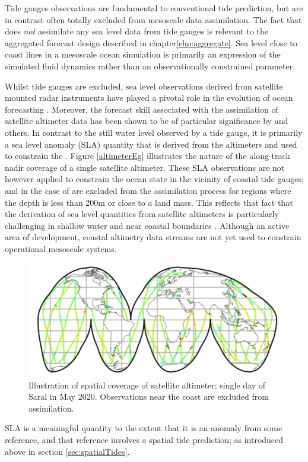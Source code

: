 Tide gauges observations are fundamental to conventional tide prediction, but are in contrast often totally excluded from mesoscale data assimilation.   The fact that \BL{} does \emph{not} assimilate any sea level data from tide gauges is relevant to the aggregated forecast design described in chapter\ref{chp:aggregate}.      
Sea level close to coast lines in a mesoscale ocean simulation is primarily an expression of the simulated fluid dynamics rather than an observationally constrained parameter.

Whilst tide gauges are excluded, sea level observations derived from satellite mounted radar instruments have played a pivotal role in the evolution of ocean forecasting \citep{Fu:2001ub}.  Moreover, the forecast skill associated with the assimilation of satellite altimeter data has been shown to be of particular significance by  \cite{10.5194/os-13-1077-2017} and others.
In contrast to the still water level observed by a tide gauge, it is primarily a sea level anomaly (SLA) quantity that is derived from the altimeters and used to constrain the \OGCM{}. Figure \ref{altimeterEg} illustrates the nature of the along-track nadir coverage of a single satellite altimeter.
These SLA observations are not however applied to constrain the ocean state in the vicinity of coastal tide gauges; and in the case of \BL{} are excluded from the assimilation process for regions where the depth is less than 200m or close to a land mass.   This reflects that fact that the derivation of sea level quantities from satellite altimeters is particularly challenging in shallow water and near coastal boundaries \citep{Woodworth:2011bf}.    Although an active area of development, coastal altimetry data streams are not yet used to constrain operational mesoscale systems.
\begin{figure}[h]\centering
  \includegraphics[width=\figwidthHalf]{figures/maps/altimeterCoverageEg.png}
  \caption{Illustration of spatial coverage of satellite altimeter; single day of Saral in May 2020. Observations near the coast are excluded from assimilation.}
  \label{fig:altimeterEg}
\end{figure}
SLA is a meaningful quantity to the extent that it is an anomaly from some reference, and that reference involves a spatial tide prediction; as introduced above in section \ref{sec:spatialTides}.



